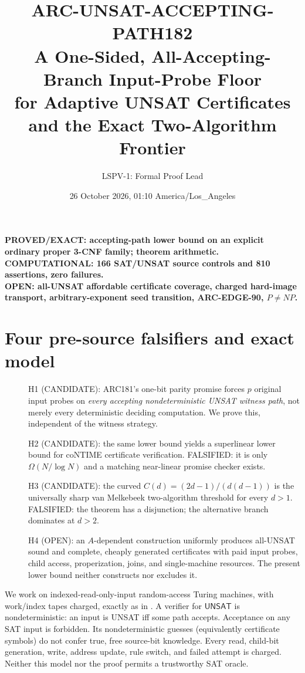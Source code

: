 \documentclass[11pt]{article}
\title{ARC-UNSAT-ACCEPTING-PATH182\\\large A One-Sided, All-Accepting-Branch Input-Probe Floor\\for Adaptive UNSAT Certificates and the Exact Two-Algorithm Frontier}
\author{LSPV-1: Formal Proof Lead}
\date{26 October 2026, 01:10 America/Los\_Angeles}
\newcommand{\UNSAT}{\mathsf{UNSAT}}
\begin{document}
\maketitle
\begin{center}
\textbf{PROVED/EXACT: accepting-path lower bound on an explicit ordinary proper 3-CNF family; theorem arithmetic.}\\
\textbf{COMPUTATIONAL: 166 SAT/UNSAT source controls and 810 assertions, zero failures.}\\
\textbf{OPEN: all-UNSAT affordable certificate coverage, charged hard-image transport, arbitrary-exponent seed transition, ARC-EDGE-90, $P\ne NP$.}
\end{center}

\section{Four pre-source falsifiers and exact model}
\begin{description}
\item[] H1 (CANDIDATE): ARC181's one-bit parity promise forces $p$ original input probes on \emph{every accepting nondeterministic UNSAT witness path}, not merely every deterministic deciding computation. We prove this, independent of the witness strategy.
\item[] H2 (CANDIDATE): the same lower bound yields a superlinear lower bound for coNTIME certificate verification. FALSIFIED: it is only $\Omega(N/\log N)$ and a matching near-linear promise checker exists.
\item[] H3 (CANDIDATE): the curved $C(d)=(2d-1)/(d(d-1))$ is the universally sharp van Melkebeek two-algorithm threshold for every $d>1$. FALSIFIED: the theorem has a disjunction; the alternative branch dominates at $d>2$.
\item[] H4 (OPEN): an $A$-dependent construction uniformly produces all-UNSAT sound and complete, cheaply generated certificates with paid input probes, child access, properization, joins, and single-machine resources. The present lower bound neither constructs nor excludes it.
\end{description}
We work on indexed-read-only-input random-access Turing machines, with work/index tapes charged, exactly as in \cite{flmv,vm07}. A verifier for $\UNSAT$ is nondeterministic: an input is UNSAT iff some path accepts. Acceptance on any SAT input is forbidden. Its nondeterministic guesses (equivalently certificate symbols) do not confer true, free source-bit knowledge. Every read, child-bit generation, write, address update, rule switch, and failed attempt is charged. Neither this model nor the proof permits a trustworthy SAT oracle.
\end{document}
